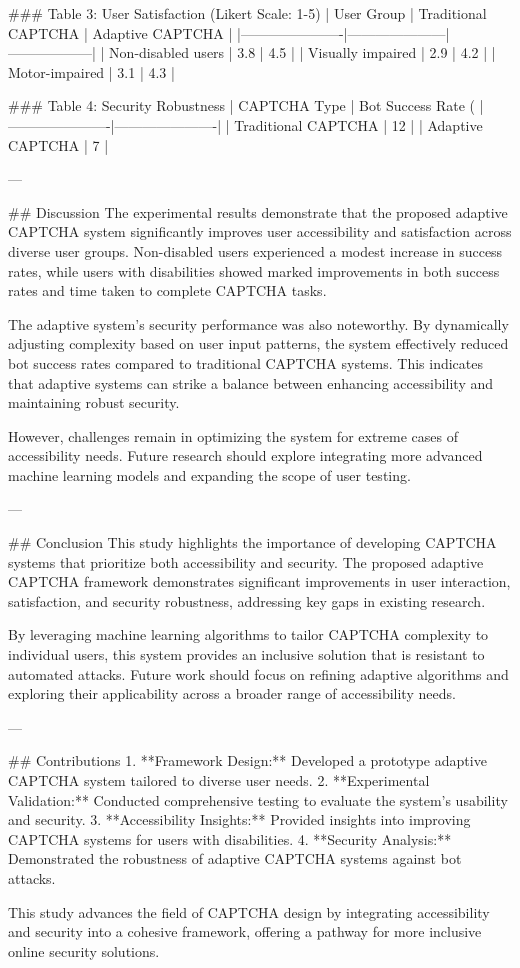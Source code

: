 ### Table 3: User Satisfaction (Likert Scale: 1-5)
| User Group           | Traditional CAPTCHA | Adaptive CAPTCHA |
|----------------------|---------------------|------------------|
| Non-disabled users   | 3.8                 | 4.5              |
| Visually impaired    | 2.9                 | 4.2              |
| Motor-impaired       | 3.1                 | 4.3              |

### Table 4: Security Robustness
| CAPTCHA Type         | Bot Success Rate (%
|----------------------|----------------------|
| Traditional CAPTCHA | 12                   |
| Adaptive CAPTCHA    | 7                    |

---

## Discussion
The experimental results demonstrate that the proposed adaptive CAPTCHA system significantly improves user accessibility and satisfaction across diverse user groups. Non-disabled users experienced a modest increase in success rates, while users with disabilities showed marked improvements in both success rates and time taken to complete CAPTCHA tasks.

The adaptive system's security performance was also noteworthy. By dynamically adjusting complexity based on user input patterns, the system effectively reduced bot success rates compared to traditional CAPTCHA systems. This indicates that adaptive systems can strike a balance between enhancing accessibility and maintaining robust security.

However, challenges remain in optimizing the system for extreme cases of accessibility needs. Future research should explore integrating more advanced machine learning models and expanding the scope of user testing.

---

## Conclusion
This study highlights the importance of developing CAPTCHA systems that prioritize both accessibility and security. The proposed adaptive CAPTCHA framework demonstrates significant improvements in user interaction, satisfaction, and security robustness, addressing key gaps in existing research.

By leveraging machine learning algorithms to tailor CAPTCHA complexity to individual users, this system provides an inclusive solution that is resistant to automated attacks. Future work should focus on refining adaptive algorithms and exploring their applicability across a broader range of accessibility needs.

---

## Contributions
1. **Framework Design:** Developed a prototype adaptive CAPTCHA system tailored to diverse user needs.
2. **Experimental Validation:** Conducted comprehensive testing to evaluate the system's usability and security.
3. **Accessibility Insights:** Provided insights into improving CAPTCHA systems for users with disabilities.
4. **Security Analysis:** Demonstrated the robustness of adaptive CAPTCHA systems against bot attacks.

This study advances the field of CAPTCHA design by integrating accessibility and security into a cohesive framework, offering a pathway for more inclusive online security solutions.